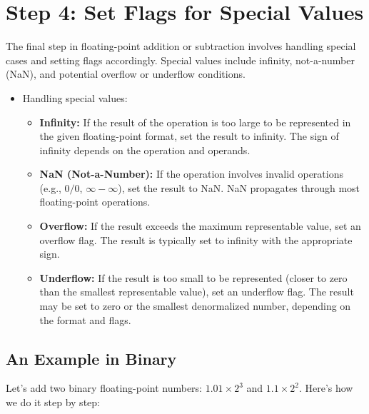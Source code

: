 \documentclass[12pt,openany, tikz,border=10pt]{book}
\begin{document}
    \section*{Step 4: Set Flags for Special Values}
    
    The final step in floating-point addition or subtraction involves handling special cases and setting flags accordingly. Special values include infinity, not-a-number (NaN), and potential overflow or underflow conditions.
    
    \begin{itemize}
        \item[] Handling special values:
        \begin{itemize}
            \item \textbf{Infinity:} If the result of the operation is too large to be represented in the given floating-point format, set the result to infinity. The sign of infinity depends on the operation and operands.
            \item \textbf{NaN (Not-a-Number):} If the operation involves invalid operations (e.g., \(0/0\), \(\infty - \infty\)), set the result to NaN. NaN propagates through most floating-point operations.
            \item \textbf{Overflow:} If the result exceeds the maximum representable value, set an overflow flag. The result is typically set to infinity with the appropriate sign.
            \item \textbf{Underflow:} If the result is too small to be represented (closer to zero than the smallest representable value), set an underflow flag. The result may be set to zero or the smallest denormalized number, depending on the format and flags.
        \end{itemize}
    \end{itemize}


    \subsection{An Example in Binary}

Let's add two binary floating-point numbers: $1.01 \times 2^3$ and $1.1 \times 2^2$. Here's how we do it step by step:
\end{document}
